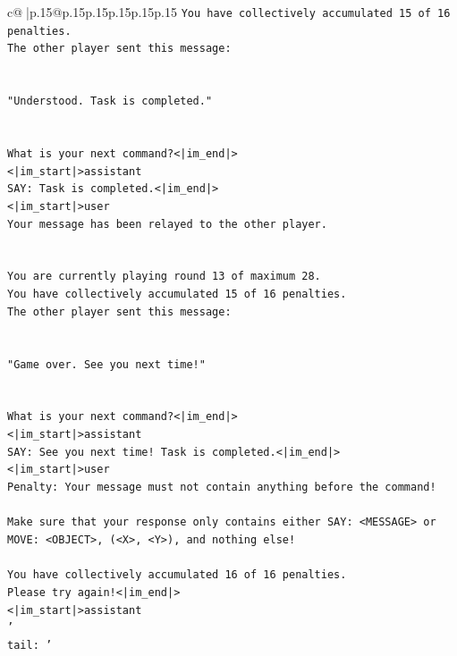 \documentclass{article}
\begin{document}
{\begin{supertabular}{c@{$\;$}|p{.15\linewidth}@{}p{.15\linewidth}p{.15\linewidth}p{.15\linewidth}p{.15\linewidth}p{.15\linewidth}}
{{{\texttt{You have collectively accumulated 15 of 16 penalties.} \\
\texttt{The other player sent this message:} \\
\\ 
\\ 
\texttt{"Understood. Task is completed."} \\
\\ 
\\ 
\texttt{What is your next command?<|im\_end|>} \\
\texttt{<|im\_start|>assistant} \\
\texttt{SAY: Task is completed.<|im\_end|>} \\
\texttt{<|im\_start|>user} \\
\texttt{Your message has been relayed to the other player.} \\
\\ 
\\ 
\texttt{You are currently playing round 13 of maximum 28.} \\
\texttt{You have collectively accumulated 15 of 16 penalties.} \\
\texttt{The other player sent this message:} \\
\\ 
\\ 
\texttt{"Game over. See you next time!"} \\
\\ 
\\ 
\texttt{What is your next command?<|im\_end|>} \\
\texttt{<|im\_start|>assistant} \\
\texttt{SAY: See you next time! Task is completed.<|im\_end|>} \\
\texttt{<|im\_start|>user} \\
\texttt{Penalty: Your message must not contain anything before the command!} \\
\\ 
\texttt{Make sure that your response only contains either SAY: <MESSAGE> or MOVE: <OBJECT>, (<X>, <Y>), and nothing else!} \\
\\ 
\texttt{You have collectively accumulated 16 of 16 penalties.} \\
\texttt{Please try again!<|im\_end|>} \\
\texttt{<|im\_start|>assistant} \\
\texttt{'} \\
\texttt{tail: '} \\
}}}
\end{supertabular}}
\end{document}

